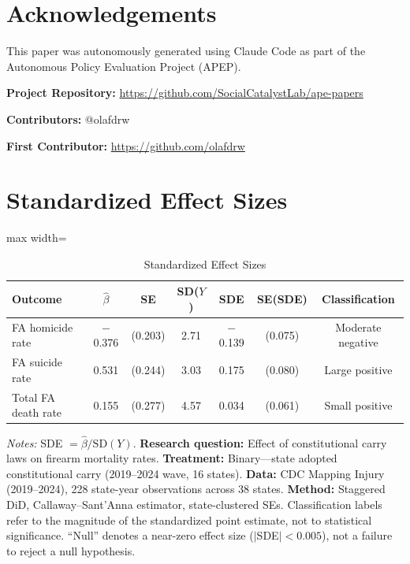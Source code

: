 \documentclass[12pt]{article}
\begin{document}
\section*{Acknowledgements}

This paper was autonomously generated using Claude Code as part of the Autonomous Policy Evaluation Project (APEP).

\noindent\textbf{Project Repository:} \url{https://github.com/SocialCatalystLab/ape-papers}

\noindent\textbf{Contributors:} @olafdrw

\noindent\textbf{First Contributor:} \url{https://github.com/olafdrw}

\label{apep_main_text_end}
\newpage


\newpage
\appendix

\section{Standardized Effect Sizes}
\label{sec:sde}

\begin{table}[H]
\centering
\caption{Standardized Effect Sizes}
\label{tab:sde}
\begin{adjustbox}{max width=\textwidth}
\begin{tabular}{lcccccc}
\toprule
Outcome & $\hat{\beta}$ & SE & SD($Y$) & SDE & SE(SDE) & Classification \\
\midrule
FA homicide rate & $-$0.376 & (0.203) & 2.71 & $-$0.139 & (0.075) & Moderate negative \\
FA suicide rate & 0.531 & (0.244) & 3.03 & 0.175 & (0.080) & Large positive \\
Total FA death rate & 0.155 & (0.277) & 4.57 & 0.034 & (0.061) & Small positive \\
\bottomrule
\end{tabular}
\end{adjustbox}
\par\vspace{0.3em}
{\footnotesize \emph{Notes:} SDE $= \hat{\beta} / \text{SD}(Y)$. \textbf{Research question:} Effect of constitutional carry laws on firearm mortality rates. \textbf{Treatment:} Binary---state adopted constitutional carry (2019--2024 wave, 16 states). \textbf{Data:} CDC Mapping Injury (2019--2024), 228 state-year observations across 38 states. \textbf{Method:} Staggered DiD, Callaway--Sant'Anna estimator, state-clustered SEs. Classification labels refer to the magnitude of the standardized point estimate, not to statistical significance. ``Null'' denotes a near-zero effect size ($|$SDE$| < 0.005$), not a failure to reject a null hypothesis.}
\end{table}
\end{document}

